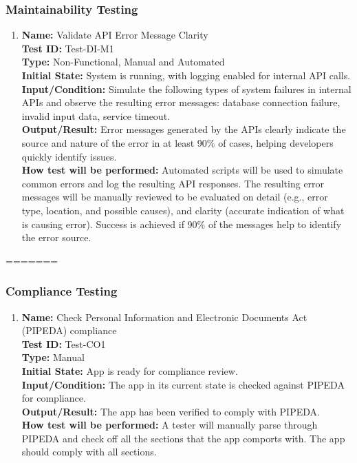 \documentclass[12pt, titlepage]{article}
\begin{document}
\begin{enumerate}
\begin{enumerate}
\end{enumerate}
\subsubsection{Maintainability Testing}

\begin{enumerate}
    
\item \textbf{Name:} Validate API Error Message Clarity \label{itm:Test-DI-M1} \\
    \textbf{Test ID:} Test-DI-M1 \\
    \textbf{Type:} Non-Functional, Manual and Automated \\
    \textbf{Initial State:} System is running, with logging enabled for internal API calls. \\
    \textbf{Input/Condition:} Simulate the following types of system failures in internal APIs and observe the resulting error messages: database connection failure, invalid input data, service timeout. \\
    \textbf{Output/Result:} Error messages generated by the APIs clearly indicate the source and nature of the error in at least 90\% of cases, helping developers quickly identify issues. \\
    \textbf{How test will be performed:} Automated scripts will be used to simulate common errors and log the resulting API responses. The resulting error messages will be manually reviewed to be evaluated on detail (e.g., error type, location, and possible causes), and clarity (accurate indication of what is causing error). Success is achieved if 90\% of the messages help to identify the error source.


\end{enumerate}
=======
\subsubsection{Compliance Testing}

\begin{enumerate}

    \item
    \textbf{Name:} Check Personal Information and Electronic
Documents Act (PIPEDA) \cite{PIPEDA} compliance \label{itm:Test-CO1} \\
    \textbf{Test ID:} Test-CO1 \\
    \textbf{Type:} Manual \\
    \textbf{Initial State:} App is ready for compliance review. \\
    \textbf{Input/Condition:} The app in its current state is checked against PIPEDA for compliance. \\
    \textbf{Output/Result:} The app has been verified to comply with PIPEDA. \\
    \textbf{How test will be performed:} A tester will manually parse through PIPEDA and check off all the sections that the app comports with. The app should comply with all sections.


\end{enumerate}
\end{enumerate}
\end{document}
